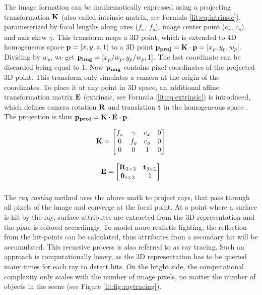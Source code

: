 The image formation can be mathematically expressed using a projecting transformation $\bm{\mathrm{K}}$ (also called intrinsic matrix, see Formula \ref{lit:eq:intrinsic}), parameterized by focal lengths along axes ($f_x$, $f_y$), image center point ($c_x$, $c_y$), and axis skew $\gamma$. This transform maps a 3D point, which is extended to 4D homogeneous space $\bm{\mathrm{p}} = [x, y, z, 1]$ to a 3D point $\bm{\mathrm{p_{proj}}} = \bm{\mathrm{K}} \cdot \bm{\mathrm{p}} = [x_p, y_p, w_p]$. Dividing by $w_p$, we get $\bm{\mathrm{p_{img}}} = [x_p/w_p, y_p/w_p, 1]$. The last coordinate can be discarded being equal to 1. Now $\bm{\mathrm{p_{img}}}$ contains pixel coordinates of the projected 3D point. This transform only simulates a camera at the origin of the coordinates. To place it at any point in 3D space, an additional affine transformation matrix $\bm{\mathrm{E}}$ (extrinsic, see Formula \ref{lit:eq:extrinsic}) is introduced, which defines camera rotation $\bm{\mathrm{R}}$ and translation $\bm{\mathrm{t}}$ in the homogeneous space \cite{survey:advances-nn22}. The projection is thus $\bm{\mathrm{p_{proj}}} = \bm{\mathrm{K}} \cdot \bm{\mathrm{E}} \cdot \bm{\mathrm{p}}$ .

\begin{multicols}{2}
	\setlength\abovedisplayskip{0pt}
	\noindent
	\begin{equation}
		\bm{\mathrm{K}} = \begin{bmatrix} 
			f_x & \gamma & c_x & 0 \\
			0   & f_y    & c_y & 0 \\
			0   & 0      & 1   & 0 \\
		\end{bmatrix}
		\label{lit:eq:intrinsic}
	\end{equation}
	\begin{equation}
		\vphantom{\begin{bmatrix} a \\ b \\ c \end{bmatrix}}
		\bmr{E} = \begin{bmatrix} 
			\bmr{R}_{3 \times 3} & \bmr{t}_{3 \times 1} \\
			\bmr{0}_{1 \times 3} & 1 \\
		\end{bmatrix}
		\label{lit:eq:extrinsic}
	\end{equation}
	\setlength\belowdisplayskip{0pt} 
\end{multicols} 

The \textit{ray casting} method uses the above math to project rays, that pass through all pixels of the image and converge at the focal point. At a point where a surface is hit by the ray, surface attributes are extracted from the 3D representation and the pixel is colored accordingly. To model more realistic lighting, the reflection from the hit-points can be calculated, thus attributes from a secondary hit will be accumulated. This recursive process is also referred to as ray tracing. Such an approach is computationally heavy, as the 3D representation has to be queried many times for each ray to detect hits. On the bright side, the computational complexity only scales with the number of image pixels, no matter the number of objects in the scene (see Figure \ref{lit:fig:raytracing}).

